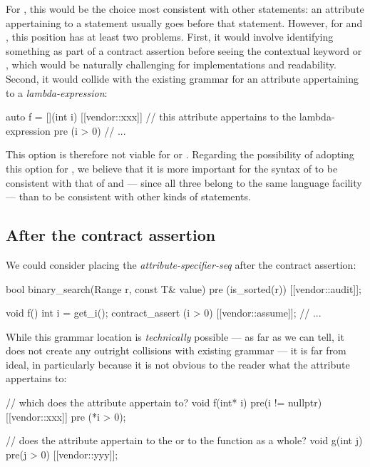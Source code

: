 For , this would be the choice most consistent with other statements: an attribute appertaining to a statement usually goes before that statement. However, for  and , this position has at least two problems. First, it would involve identifying something as part of a
contract assertion before seeing the contextual keyword  or , which would be naturally challenging for implementations and
readability. Second, it would collide with the existing grammar for an attribute appertaining to a \emph{lambda-expression}:

\begin{codeblock}
auto f = [](int i) [[vendor::xxx]]  // this attribute appertains to the lambda-expression
  pre (i > 0) {
  // ...
}
\end{codeblock}

This option is therefore not viable for  or . Regarding the possibility of adopting this option for , we believe that it is more important for the syntax of  to be consistent with that of  and  --- since all three belong to the same language facility --- than to be consistent with other kinds of statements.

\subsection{After the contract assertion}
We could consider placing the \emph{attribute-specifier-seq} after the contract assertion:
\begin{codeblock}
bool binary_search(Range r, const T& value)
  pre (is_sorted(r)) [[vendor::audit]];
  
void f() {
  int i = get_i();
  contract_assert (i > 0) [[vendor::assume]];
  // ...
}
\end{codeblock}
While this grammar location is \emph{technically} possible --- as far as we can tell, it does not create any outright collisions with existing grammar --- it is far from ideal, in particularly because it is not obvious to the reader what the attribute appertains to:
\begin{codeblock}
// which  does the attribute appertain to?
void f(int* i)
  pre(i != nullptr) [[vendor::xxx]] pre (*i > 0);  

// does the attribute appertain to the  or to the function  as a whole?
void g(int j) pre(j > 0) [[vendor::yyy]]; 
\end{codeblock}

